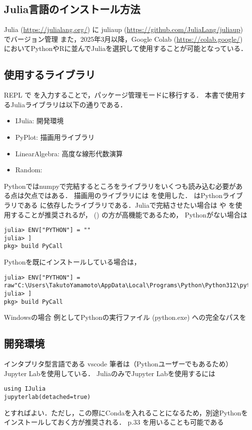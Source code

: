\subsection{Julia言語のインストール方法}
Julia (\url{https://julialang.org/}) に
juliaup (\url{https://github.com/JuliaLang/juliaup}) でバージョン管理
また，2025年3月以降，Google Colab (\url{https://colab.google/}) においてPythonやRに並んでJuliaを選択して使用することが可能となっている．
\subsection{使用するライブラリ}
REPL
で\jl{]} を入力することで，パッケージ管理モードに移行する．
本書で使用するJuliaライブラリは以下の通りである．
\begin{itemize}
\item IJulia: 開発環境
\item PyPlot: 描画用ライブラリ
\item LinearAlgebra: 高度な線形代数演算
\item Random: 
\end{itemize}
Pythonではnumpyで完結するところをライブラリをいくつも読み込む必要がある点は欠点ではある．
描画用のライブラリには  を使用した． はPythonライブラリである  に依存したライブラリである．Juliaで完結させたい場合は  や  を使用することが推奨されるが， () の方が高機能であるため，
Pythonがない場合は
\begin{lstlisting}
julia> ENV["PYTHON"] = ""
julia> ]
pkg> build PyCall
\end{lstlisting}
Pythonを既にインストールしている場合は，
\begin{lstlisting}
julia> ENV["PYTHON"] = raw"C:\Users\TakutoYamamoto\AppData\Local\Programs\Python\Python312\python.exe"
julia> ]
pkg> build PyCall
\end{lstlisting}
Windowsの場合
例としてPythonの実行ファイル (python.exe) への完全なパスを
\subsection{開発環境}
インタプリタ型言語である
vscode
筆者は（Pythonユーザーでもあるため）Jupyter Labを使用している．
JuliaのみでJupyter Labを使用するには
\begin{lstlisting}
using IJulia
jupyterlab(detached=true)
\end{lstlisting}
とすればよい．ただし，この際にCondaを入れることになるため，別途Pythonをインストールしておく方が推奨される．
p.33
 を用いることも可能である
